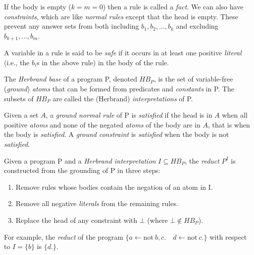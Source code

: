 If the body is empty ($k = m = 0$) then a rule is called a \textit{fact}. We can also have \textit{constraints}, which are like \textit{normal rules} except that the head is empty. These prevent any answer sets from both including $b_1, b_2, ..., b_k$ and excluding $b_{k+1}, ..., b_m$.

\begin{definition}
A variable in a rule is said to be \textit{safe} if it occurs in at least one positive \textit{literal} (i.e., the $b_i$s in the above rule) in the body of the rule.
\end{definition}

\begin{definition}
The \textit{Herbrand base} of a program P, denoted $HB_P$, is the set of variable-free (\textit{ground}) \textit{atoms} that can be formed from predicates and \textit{constants} in P. The subsets of $HB_P$ are called the (Herbrand) \textit{interpretations} of P.
\end{definition}

\begin{definition} 
\label{def:satisfiability}
Given a set $A$, a \textit{ground normal rule} of P is \textit{satisfied} if the head is in $A$ when all positive \textit{atoms} and none of the negated \textit{atoms} of the body are in $A$, that is when the body is \textit{satisfied}. A \textit{ground constraint} is \textit{satisfied} when the body is not \textit{satisfied}.
\end{definition}

\begin{definition}
Given a program P and a \textit{Herbrand interpretation} $I \subseteq HB_P$, the \textit{reduct} $P^I$ is constructed from the grounding of P in three steps:
\begin{enumerate}[nolistsep]
\item Remove rules whose bodies contain the negation of an atom in I.
\item Remove all negative \textit{literals} from the remaining rules.
\item Replace the head of any constraint with $\bot$ (where $\bot \notin HB_P$).
\end{enumerate}
For example, the \textit{reduct} of the program $\{a \leftarrow \text{not}\ b, c.\quad d \leftarrow \text{not}\ c.\}$ with respect to $I=\{b\}$ is $\{d.\}$.
\end{definition}

